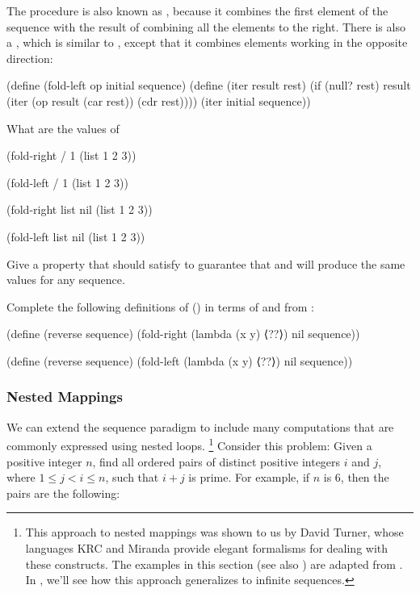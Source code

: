 \begin{exercise}
	\label{Exercise 2.38}
	The  procedure is also known as , because it combines the first element of the sequence with the result of combining all the elements to the right.
	There is also a , which is similar to , except that it combines elements working in the opposite direction:
	\begin{scheme}
	  (define (fold-left op initial sequence)
	    (define (iter result rest)
	      (if (null? rest)
	          result
	          (iter (op result (car rest))
	                (cdr rest))))
	    (iter initial sequence))
	\end{scheme}
	What are the values of
	\begin{scheme}
	  (fold-right / 1 (list 1 2 3))

	  (fold-left / 1 (list 1 2 3))

	  (fold-right list nil (list 1 2 3))

	  (fold-left list nil (list 1 2 3))
	\end{scheme}
	Give a property that  should satisfy to guarantee that  and  will produce the same values for any sequence.
\end{exercise}



\begin{exercise}
	\label{Exercise 2.39}
	Complete the following definitions of  () in terms of  and  from :
	\begin{scheme}
	  (define (reverse sequence)
	    (fold-right (lambda (x y) ⟨??⟩) nil sequence))

	  (define (reverse sequence)
	    (fold-left (lambda (x y) ⟨??⟩) nil sequence))
	\end{scheme}
\end{exercise}



\subsubsection*{Nested Mappings}

We can extend the sequence paradigm to include many computations that are commonly expressed using nested loops.%
\footnote{
	This approach to nested mappings was shown to us by David Turner, whose languages KRC and Miranda provide elegant formalisms for dealing with these constructs.
	The examples in this section (see also ) are adapted from .
	In , we’ll see how this approach generalizes to infinite sequences.
}
Consider this problem:
Given a positive integer \( n \), find all ordered pairs of distinct positive integers \( i \) and \( j \), where \( 1 ≤ j < i ≤ n \), such that \( i + j \) is prime.
For example, if \( n \) is \( 6 \), then the pairs are the following:

